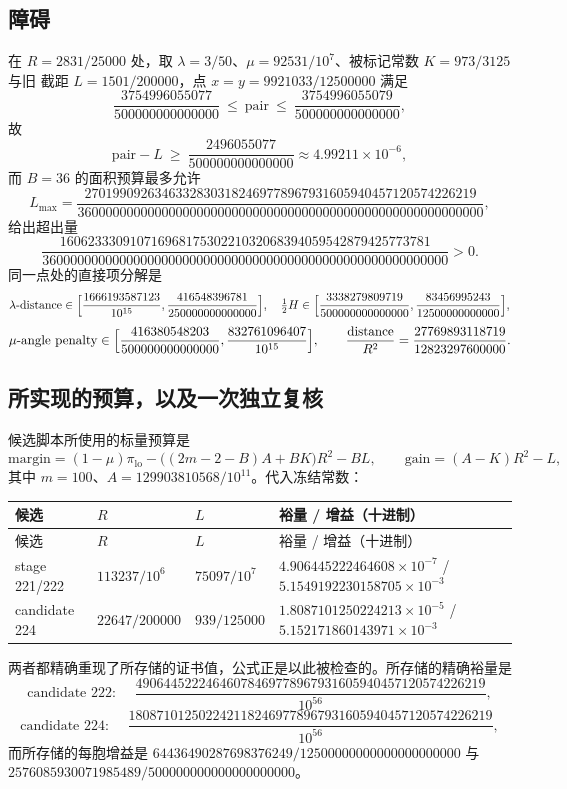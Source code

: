 \subsection{障碍}

在 $R=2831/25000$ 处，取 $\lambda=3/50$、$\mu=92531/10^{7}$、被标记常数 $K=973/3125$ 与旧
截距 $L=1501/200000$，点 $x=y=9921033/12500000$ 满足
\[
\frac{3754996055077}{500000000000000}\ \le\ \text{pair}\ \le\
\frac{3754996055079}{500000000000000},
\]
故
\[
\text{pair}-L\ \ge\ \frac{2496055077}{500000000000000}\approx4.99211\times10^{-6},
\]
而 $B=36$ 的面积预算最多允许
\[
L_{\max}=\frac{27019909263463328303182469778967931605940457120574226219}
{3600000000000000000000000000000000000000000000000000000000},
\]
给出超出量
\[
\frac{16062333091071696817530221032068394059542879425773781}
{3600000000000000000000000000000000000000000000000000000000}>0 .
\]
同一点处的直接项分解是
\[
\lambda\text{-distance}\in\Bigl[\frac{1666193587123}{10^{15}},\frac{416548396781}{250000000000000}\Bigr],
\quad
\tfrac12H\in\Bigl[\frac{3338279809719}{500000000000000},\frac{83456995243}{12500000000000}\Bigr],
\]
\[
\mu\text{-angle penalty}\in\Bigl[\frac{416380548203}{500000000000000},\frac{832761096407}{10^{15}}\Bigr],
\qquad
\frac{\text{distance}}{R^2}=\frac{27769893118719}{12823297600000}.
\]

\subsection{所实现的预算，以及一次独立复核}

候选脚本所使用的标量预算是
\[
\text{margin}=(1-\mu)\pi_{\text{lo}}-\bigl((2m-2-B)A+BK\bigr)R^2-BL,
\qquad
\text{gain}=(A-K)R^2-L,
\]
其中 $m=100$、$A=129903810568/10^{11}$。代入冻结常数：
{\footnotesize
\begin{longtable}{@{}llll@{}}
\toprule
候选 & $R$ & $L$ & 裕量 / 增益（十进制） \\
\midrule
\endfirsthead
\toprule
候选 & $R$ & $L$ & 裕量 / 增益（十进制） \\
\midrule
\endhead
\bottomrule
\endlastfoot
stage 221/222 & $113237/10^{6}$ & $75097/10^{7}$ &
$4.906445222464608\times10^{-7}$ \;/\; $5.1549192230158705\times10^{-3}$ \\
candidate 224 & $22647/200000$ & $939/125000$ &
$1.8087101250224213\times10^{-5}$ \;/\; $5.152171860143971\times10^{-3}$ \\
\end{longtable}}

两者都精确重现了所存储的证书值，公式正是以此被检查的。所存储的精确裕量是
\[
\text{candidate 222: }\quad \frac{49064452224646078469778967931605940457120574226219}{10^{56}},
\]
\[
\text{candidate 224: }\quad \frac{1808710125022421182469778967931605940457120574226219}{10^{56}},
\]
而所存储的每胞增益是 $64436490287698376249/12500000000000000000000$ 与
$2576085930071985489/500000000000000000000$。

